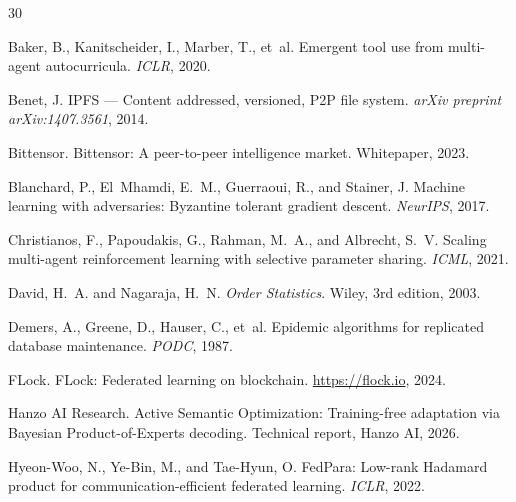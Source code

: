 \documentclass[11pt]{article}
\begin{document}

\begin{thebibliography}{30}

Baker, B., Kanitscheider, I., Marber, T., et~al.
\newblock Emergent tool use from multi-agent autocurricula.
\newblock \emph{ICLR}, 2020.

Benet, J.
\newblock IPFS --- Content addressed, versioned, P2P file system.
\newblock \emph{arXiv preprint arXiv:1407.3561}, 2014.

Bittensor.
\newblock Bittensor: A peer-to-peer intelligence market.
\newblock Whitepaper, 2023.

Blanchard, P., El~Mhamdi, E.~M., Guerraoui, R., and Stainer, J.
\newblock Machine learning with adversaries: Byzantine tolerant gradient
  descent.
\newblock \emph{NeurIPS}, 2017.

Christianos, F., Papoudakis, G., Rahman, M.~A., and Albrecht, S.~V.
\newblock Scaling multi-agent reinforcement learning with selective parameter
  sharing.
\newblock \emph{ICML}, 2021.

David, H.~A. and Nagaraja, H.~N.
\newblock \emph{Order Statistics}.
\newblock Wiley, 3rd edition, 2003.

Demers, A., Greene, D., Hauser, C., et~al.
\newblock Epidemic algorithms for replicated database maintenance.
\newblock \emph{PODC}, 1987.

FLock.
\newblock FLock: Federated learning on blockchain.
\newblock \url{https://flock.io}, 2024.

Hanzo AI Research.
\newblock Active Semantic Optimization: Training-free adaptation via Bayesian
  Product-of-Experts decoding.
\newblock Technical report, Hanzo AI, 2026.

Hyeon-Woo, N., Ye-Bin, M., and Tae-Hyun, O.
\newblock FedPara: Low-rank Hadamard product for communication-efficient
  federated learning.
\newblock \emph{ICLR}, 2022.


\end{thebibliography}
\end{document}
